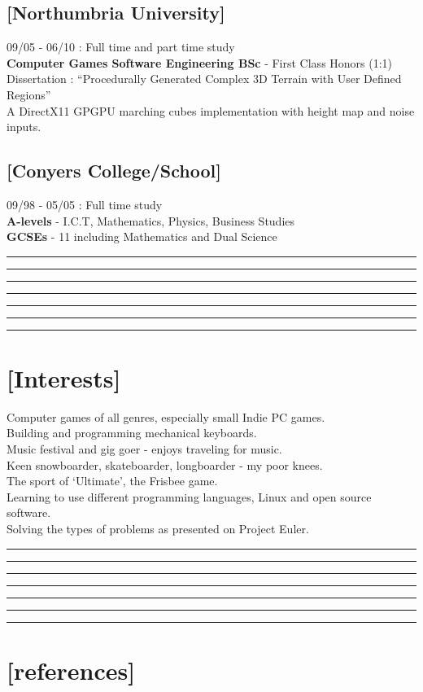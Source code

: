 \documentclass[a4paper]{res}
\newcommand{\setrule}[1]{\rule{#1}{1mm}}
\newcommand{\fibrule}[2]{ \hspace{#1}  \setrule{#2} \setrule{21mm} \setrule{13mm} \setrule{8mm} \setrule{5mm} \setrule{3mm} \setrule{2mm}  \vspace{-.52in} }
\begin{document}
\begin{resume}
\vspace{-.12in}

\subsection{[Northumbria University]} 09/05 - 06/10 : Full time and part time study\\
{\bf Computer Games Software Engineering BSc} -  First Class Honors (1:1) \\
Dissertation : ``Procedurally Generated Complex 3D Terrain with User Defined Regions'' \\
A DirectX11 GPGPU marching cubes implementation with height map and noise inputs.

\vspace{-.22in}

\subsection{[Conyers College/School]} 09/98 - 05/05 : Full time study\\
{\bf A-levels} - I.C.T, Mathematics, Physics, Business Studies \\
{\bf GCSEs} - 11 including  Mathematics and Dual Science 

\fibrule{0.9in}{3.0in}
\section{[Interests]} 

Computer games of all genres, especially small Indie PC games.\\
Building and programming mechanical keyboards.\\
Music festival and gig goer - enjoys traveling for music. \\
Keen snowboarder, skateboarder, longboarder - my poor knees. \\
The sport of `Ultimate', the Frisbee game. \\
Learning to use different programming languages, Linux and open source software.\\
Solving the types of problems as presented on Project Euler.

\fibrule{1.075in}{2.825in}
\section{[references]} 


\end{resume}
\end{document}
